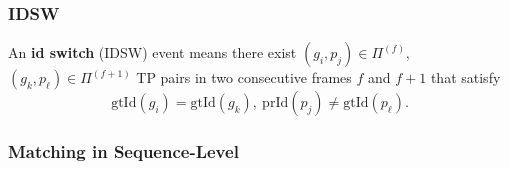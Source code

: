 \documentclass[slidestop, mathserif]{beamer}
\begin{document}
\begin{frame}
    \frametitle{IDSW}

    An {\bf id switch} (IDSW) event means there exist $(g_i, p_j)\in\Pi^{(f)}$,
    $(g_k, p_\ell)\in\Pi^{(f+1)}$ TP pairs in two consecutive frames
    $f$ and $f+1$ that satisfy
    \[
        \text{gtId}(g_i) = \text{gtId}(g_k),\ 
        \text{prId}(p_j) \neq \text{gtId}(p_\ell).
    \]

    

\end{frame}

\begin{frame}
    \frametitle{Matching in Sequence-Level}

    
\end{frame}
\end{document}
